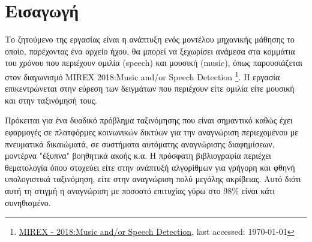\section{Εισαγωγή}

Το ζητούμενο της εργασίας είναι η ανάπτυξη ενός μοντέλου μηχανικής
μάθησης το οποίο, παρέχοντας ένα αρχείο ήχου, θα μπορεί να ξεχωρίσει
ανάμεσα στα κομμάτια του χρόνου που περιέχουν ομιλία (speech) και
μουσική (music), όπως παρουσιάζεται στον διαγωνισμό MIREX 2018:Music and/or Speech Detection 
\footnote{\href{https://www.music-ir.org/mirex/wiki/2018:Music_and/or_Speech_Detection}{MIREX - 2018:Music and/or Speech Detection}, last accessed: \today}.
Η εργασία επικεντρώνεται στην εύρεση των δειγμάτων που περιέχουν είτε ομιλία είτε μουσική
και στην ταξινόμησή τους.

Πρόκειται για ένα δυαδικό πρόβλημα ταξινόμησης που είναι σημαντικό καθώς έχει
εφαρμογές σε πλατφόρμες κοινωνικών δικτύων για την αναγνώριση
περιεχομένου με πνευματικά δικαιώματά, σε συστήματα αυτόματης
αναγνώρισης διαφημίσεων, μοντέρνα "έξυπνα" βοηθητικά ακοής κ.α. Η
πρόσφατη βιβλιογραφία περιέχει θεματολογία όπου στοχεύει είτε στην
ανάπτυξή αλγορίθμων για γρήγορη και φθηνή υπολογιστικά ταξινόμηση,
είτε στην αναγνώριση πολύ μεγάλης ακρίβειας. Αυτό διότι αυτή τη
στιγμή η αναγνώριση με ποσοστό επιτυχίας γύρω στο 98\% είναι κάτι
συνηθισμένο.